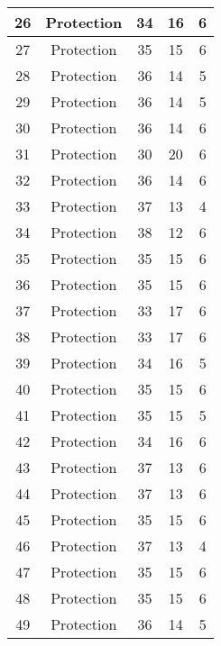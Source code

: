\documentclass[results.tex]{subfiles}
\begin{document}
\begin{center}
\begin{tabular}{| c || c | c | c | c |}
    \hline
    26 & Protection & 34 & 16 & 6 \\ 
    \hline
    27 & Protection & 35 & 15 & 6 \\ 
    \hline
    28 & Protection & 36 & 14 & 5 \\ 
    \hline
    29 & Protection & 36 & 14 & 5 \\ 
    \hline
    30 & Protection & 36 & 14 & 6 \\ 
    \hline
    31 & Protection & 30 & 20 & 6 \\ 
    \hline
    32 & Protection & 36 & 14 & 6 \\ 
    \hline
    33 & Protection & 37 & 13 & 4 \\ 
    \hline
    34 & Protection & 38 & 12 & 6 \\ 
    \hline
    35 & Protection & 35 & 15 & 6 \\ 
    \hline
    36 & Protection & 35 & 15 & 6 \\ 
    \hline
    37 & Protection & 33 & 17 & 6 \\ 
    \hline
    38 & Protection & 33 & 17 & 6 \\ 
    \hline
    39 & Protection & 34 & 16 & 5 \\ 
    \hline
    40 & Protection & 35 & 15 & 6 \\ 
    \hline
    41 & Protection & 35 & 15 & 5 \\ 
    \hline
    42 & Protection & 34 & 16 & 6 \\ 
    \hline
    43 & Protection & 37 & 13 & 6 \\ 
    \hline
    44 & Protection & 37 & 13 & 6 \\ 
    \hline
    45 & Protection & 35 & 15 & 6 \\ 
    \hline
    46 & Protection & 37 & 13 & 4 \\ 
    \hline
    47 & Protection & 35 & 15 & 6 \\ 
    \hline
    48 & Protection & 35 & 15 & 6 \\ 
    \hline
    49 & Protection & 36 & 14 & 5 \\ 
    \hline   \end{tabular}
\end{center}
\end{document}
